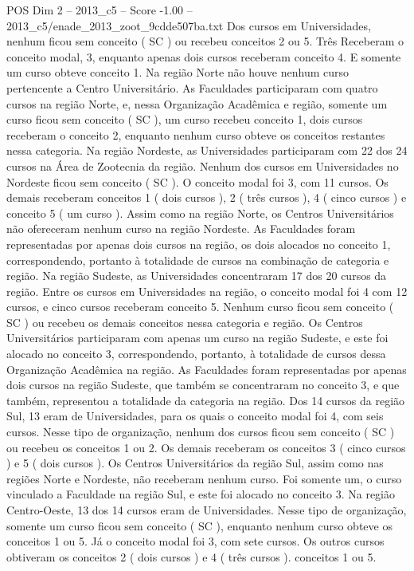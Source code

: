 \begin{textsample}{POS Dim 2 – 2013\_c5 – Score -1.00 – 2013\_c5/enade\_2013\_zoot\_9cdde507ba.txt}
Dos cursos em Universidades, nenhum ficou sem conceito ( SC ) ou recebeu conceitos 2 ou 5.
Três Receberam o conceito modal, 3, enquanto apenas dois cursos receberam conceito 4.
E somente um curso obteve conceito 1.
Na região Norte não houve nenhum curso pertencente a Centro Universitário.
As Faculdades participaram com quatro cursos na região Norte, e, nessa Organização Acadêmica e região, somente um curso ficou sem conceito ( SC ), um curso recebeu conceito 1, dois cursos receberam o conceito 2, enquanto nenhum curso obteve os conceitos restantes nessa categoria.
Na região Nordeste, as Universidades participaram com 22 dos 24 cursos na Área de Zootecnia da região.
Nenhum dos cursos em Universidades no Nordeste ficou sem conceito ( SC ).
O conceito modal foi 3, com 11 cursos.
Os demais receberam conceitos 1 ( dois cursos ), 2 ( três cursos ), 4 ( cinco cursos ) e conceito 5 ( um curso ).
Assim como na região Norte, os Centros Universitários não ofereceram nenhum curso na região Nordeste.
As Faculdades foram representadas por apenas dois cursos na região, os dois alocados no conceito 1, correspondendo, portanto à totalidade de cursos na combinação de categoria e região.
Na região Sudeste, as Universidades concentraram 17 dos 20 cursos da região.
Entre os cursos em Universidades na região, o conceito modal foi 4 com 12 cursos, e cinco cursos receberam conceito 5.
Nenhum curso ficou sem conceito ( SC ) ou recebeu os demais conceitos nessa categoria e região.
Os Centros Universitários participaram com apenas um curso na região Sudeste, e este foi alocado no conceito 3, correspondendo, portanto, à totalidade de cursos dessa Organização Acadêmica na região.
As Faculdades foram representadas por apenas dois cursos na região Sudeste, que também se concentraram no conceito 3, e que também, representou a totalidade da categoria na região.
Dos 14 cursos da região Sul, 13 eram de Universidades, para os quais o conceito modal foi 4, com seis cursos.
Nesse tipo de organização, nenhum dos cursos ficou sem conceito ( SC ) ou recebeu os conceitos 1 ou 2.
Os demais receberam os conceitos 3 ( cinco cursos ) e 5 ( dois cursos ).
Os Centros Universitários da região Sul, assim como nas regiões Norte e Nordeste, não receberam nenhum curso.
Foi somente um, o curso vinculado a Faculdade na região Sul, e este foi alocado no conceito 3.
Na região Centro-Oeste, 13 dos 14 cursos eram de Universidades.
Nesse tipo de organização, somente um curso ficou sem conceito ( SC ), enquanto nenhum curso obteve os conceitos 1 ou 5.
Já o conceito modal foi 3, com sete cursos.
Os outros cursos obtiveram os conceitos 2 ( dois cursos ) e 4 ( três cursos ). conceitos 1 ou 5.

\end{textsample}
